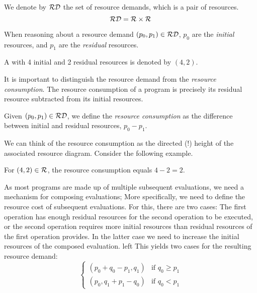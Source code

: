 \begin{definition}\label{def:resource-pair}
   We denote by \(\mathcal{RD}\) the set of resource demands, which is a pair of resources.
   \[
      \mathcal{RD} = \mathcal{R} \times \mathcal{R}
   \]
\end{definition}

When reasoning about a resource demand \((p_0, p_1) \in \mathcal{RD}\), \(p_0\) are the \emph{initial} resources, and \(p_1\) are the \emph{residual} resources. 

\begin{example}
   A  with 4 initial and 2 residual resources is denoted by \((4, 2)\).
\end{example}


It is important to distinguish the resource demand from the \emph{resource consumption}. The resource consumption of a program is precisely its residual resource subtracted from its initial resources. 

\begin{definition}\label{def:resource-consumption}
   Given \((p_0, p_1) \in \mathcal{RD}\), we define the \emph{resource consumption} as the difference between initial and residual resources, \(p_0 - p_1\).
\end{definition}

We can think of the resource consumption as the directed (!) height of the associated resource diagram. Consider the following example.

\begin{example}
   For \((4, 2) \in \mathcal{R}\), the resource consumption equals \(4 - 2 = 2\).
\end{example}


As most programs are made up of multiple subsequent evaluations, we need a mechanism for composing evaluations; More specifically, we need to define the resource cost of subsequent evaluations. 
For this, there are two cases: The first operation has enough residual resources for the second operation to be executed, or the second operation requires more initial resources than residual resources of the first operation provides. In the latter case we need to increase the initial resources of the composed evaluation.
left
This yields two cases for the resulting resource demand:
\[
   \begin{cases}
      (p_0 + q_0 - p_1,  q_1) & \mbox{if } q_0 \geq p_1 \\
      (p_0,q_1 + p_1 - q_0) & \mbox{if } q_0 <    p_1 
   \end{cases}
\]

